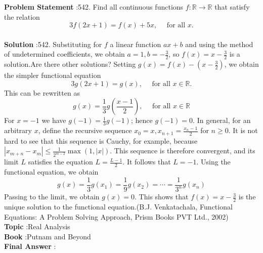 \documentclass[10pt]{article}
\begin{document}
\textbf{Problem Statement} :542. Find all continuous functions $f: \mathbb{R} \rightarrow \mathbb{R}$ that satisfy the relation$$ 3 f(2 x+1)=f(x)+5 x, \quad \text { for all } x . $$\\
\textbf{Solution} :542. Substituting for $f$ a linear function $a x+b$ and using the method of undetermined coefficients, we obtain $a=1, b=-\frac{3}{2}$, so $f(x)=x-\frac{3}{2}$ is a solution.Are there other solutions? Setting $g(x)=f(x)-\left(x-\frac{3}{2}\right)$, we obtain the simpler functional equation$$ 3 g(2 x+1)=g(x), \quad \text { for all } x \in \mathbb{R} . $$This can be rewritten as $$ g(x)=\frac{1}{3} g\left(\frac{x-1}{2}\right), \quad \text { for all } x \in \mathbb{R} $$For $x=-1$ we have $g(-1)=\frac{1}{3} g(-1)$; hence $g(-1)=0$. In general, for an arbitrary $x$, define the recursive sequence $x_{0}=x, x_{n+1}=\frac{x_{n}-1}{2}$ for $n \geq 0$. It is not hard to see that this sequence is Cauchy, for example, because $\left|x_{m+n}-x_{m}\right| \leq \frac{1}{2^{m-2}} \max (1,|x|)$. This sequence is therefore convergent, and its limit $L$ satisfies the equation $L=\frac{L-1}{2}$. It follows that $L=-1$. Using the functional equation, we obtain$$ g(x)=\frac{1}{3} g\left(x_{1}\right)=\frac{1}{9} g\left(x_{2}\right)=\cdots=\frac{1}{3^{n}} g\left(x_{n}\right) $$Passing to the limit, we obtain $g(x)=0$. This shows that $f(x)=x-\frac{3}{2}$ is the unique solution to the functional equation.(B.J. Venkatachala, Functional Equations: A Problem Solving Approach, Prism Books PVT Ltd., 2002)\\
\textbf{Topic} :Real Analysis\\
\textbf{Book} :Putnam and Beyond\\
\textbf{Final Answer} :\\
\end{document}
